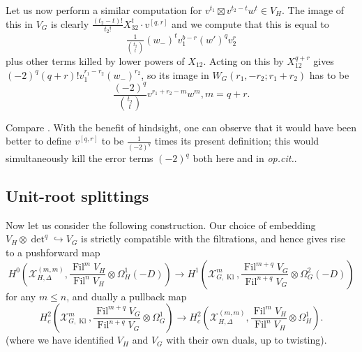 \documentclass[cjm]{ipart}
\theoremstyle{plain}
\theoremstyle{remark}
\DeclareMathOperator{\Fil}{Fil}
\DeclareMathOperator{\Kl}{Kl}
\newcommand{\cX}{\mathcal{X}}
\newcommand{\into}{\hookrightarrow}
\numberwithin{equation}{subsection}
\renewcommand{\le}{\leqslant}
\begin{document}
   Let us now perform a similar computation for $v^{t_1} \boxtimes v^{t_2-t} w^t \in V_H$. The image of this in $V_G$ is clearly $\tfrac{(t_2 - t)!}{t_2!}  X_{32}^t \cdot v^{[q,r]}$ and we compute that this is equal to
   \[ \tfrac{1}{\binom{t_2}{t}} (w_-)^t v_1^{b-r} (w')^q v_2^r \]
   plus other terms killed by lower powers of $X_{12}$. Acting on this by $X_{12}^{q + r}$ gives $(-2)^q (q + r)! v_1^{r_1-r_2} (w_-)^{r_2}$, so its image in $W_G(r_1, -r_2; r_1 + r_2)$ has to be
   \[ \frac{(-2)^q}{\binom{t_2}{t}} v^{r_1 + r_2-m}w^m, m = q + r.\]

   \begin{remark}
    Compare \cite[Theorem 9.6.4]{LSZ17}. With the benefit of hindsight, one can observe that it would have been better to define $v^{[q,r]}$ to be $\tfrac{1}{(-2)^q}$ times its present definition; this would simultaneously kill the error terms $(-2)^q$ both here and in \emph{op.cit.}.
   \end{remark}

  \subsection{Unit-root splittings}

   Now let us consider the following construction. Our choice of embedding $V_H \otimes \det^q \into V_G$ is strictly compatible with the filtrations, and hence gives rise to a pushforward map
   \[
    H^0\left(\cX_{H, \Delta}^{(m,m)}, \frac{\Fil^m V_H}{\Fil^n V_H} \otimes \Omega^1_H(-D)\right)
    \to H^1\left(\cX_{G, \Kl}^m, \frac{\Fil^{m + q} V_G}{\Fil^{n+q} V_G} \otimes \Omega^2_G(-D)\right)
   \]
   for any $m \le n$, and dually a pullback map
   \[
    H^2_c\left(\cX_{G, \Kl}^m, \frac{\Fil^{m + q} V_G}{\Fil^{n+q} V_G} \otimes \Omega^1_G\right) \to H^2_c\left(\cX_{H, \Delta}^{(m,m)}, \frac{\Fil^m V_H}{\Fil^n V_H} \otimes \Omega^1_H\right).
   \]
   (where we have identified $V_H$ and $V_G$ with their own duals, up to twisting).
\end{document}
